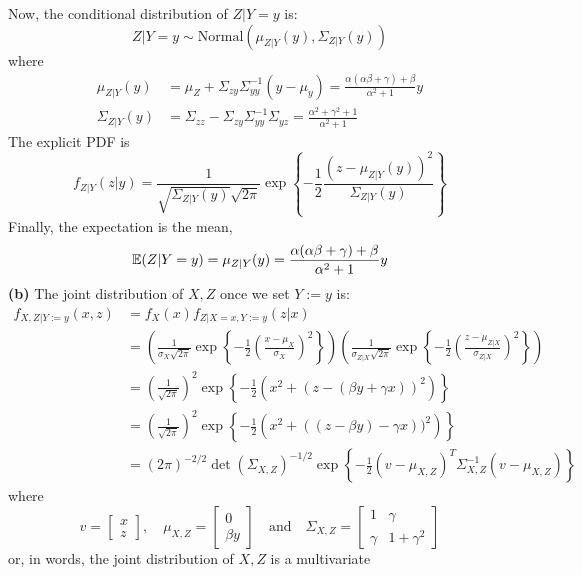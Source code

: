 Now, the conditional distribution of \(Z | Y = y\) is:
\[
Z | Y = y \sim \text{Normal}(\mu_{Z | Y} (y), \Sigma_{Z | Y}(y))
\]
where
\begin{align*}
\mu_{Z | Y}(y) 
& = \mu_Z + \Sigma_{zy} \Sigma_{yy}^{-1} (y - \mu_y) = \frac{\alpha(\alpha \beta + \gamma) + \beta}{\alpha^{2} + 1} y
\\
\Sigma_{Z | Y}(y) 
& = \Sigma_{zz} - \Sigma_{zy} \Sigma_{yy}^{-1} \Sigma_{yz} = \frac{\alpha^{2} + \gamma^{2} + 1}{\alpha^{2} + 1}
\end{align*}
The explicit PDF is
\[
f_{Z | Y}(z | y) = \frac{1}{\sqrt{\Sigma_{Z | Y}(y)} \sqrt{2 \pi}} \exp \left\{ -\frac{1}{2} \frac{\left( z - \mu_{Z | Y}(y) \right)^{2}}{\Sigma_{Z | Y}(y)} \right\}
\]
Finally, the expectation is the mean,
\[
\operatorname{\mathbb{E}}(Z | Y = y) = \mu_{Z | Y} (y) = \frac{\alpha(\alpha \beta + \gamma) + \beta}{\alpha^{2} + 1} y
\]
\textbf{(b)} The joint distribution of \(X, Z\) once we set \(Y := y\)
is:
\begin{align*}
f_{X, Z | Y := y}(x, z) &= f_X(x) f_{Z | X = x, Y := y}(z | x) \\
&= \left(\frac{1}{\sigma_X \sqrt{2\pi}} \exp \left\{-\frac{1}{2} \left(\frac{x - \mu_X}{\sigma_X}\right)^{2} \right\} \right)
\left(\frac{1}{\sigma_{Z | X} \sqrt{2\pi}} \exp \left\{-\frac{1}{2} \left(\frac{z - \mu_{Z | X}}{\sigma_{Z | X}}\right)^{2} \right\}\right) \\
&= \left( \frac{1}{\sqrt{2 \pi}} \right)^{2} \exp \left\{ -\frac{1}{2} \left( x^{2} + (z - (\beta y + \gamma x))^{2}\right) \right\} \\
&= \left( \frac{1}{\sqrt{2 \pi}} \right)^{2} \exp \left\{ -\frac{1}{2} \left( x^{2} + ((z - \beta y) - \gamma x))^{2}\right) \right\} \\
&= (2 \pi)^{-2 / 2} \det (\Sigma_{X, Z})^{-1/2} \exp \left\{ -\frac{1}{2} (v - \mu_{X, Z})^T \Sigma_{X, Z}^{-1} (v - \mu_{X, Z})\right\}
\end{align*}
where
\[
v = \begin{bmatrix}x \\ z\end{bmatrix},
\quad \mu_{X, Z} = \begin{bmatrix}0 \\ \beta y\end{bmatrix}
\quad \text{and} \quad
\Sigma_{X, Z} = \begin{bmatrix}
1  & \gamma \\
\gamma & 1 + \gamma^{2}
\end{bmatrix}
\]
or, in words, the joint distribution of \(X, Z\) is a multivariate
